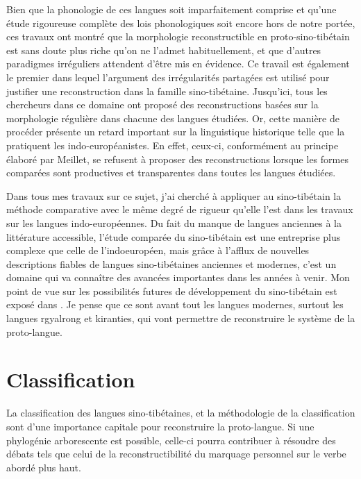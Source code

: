 \documentclass[oldfontcommands,oneside,a4paper,11pt]{memoir}
\begin{document}
Bien que la phonologie de ces langues soit imparfaitement comprise et qu’une étude rigoureuse complète des lois phonologiques soit encore hors de notre portée, ces travaux ont montré que la morphologie reconstructible en proto-sino-tibétain est sans doute plus riche qu’on ne l’admet habituellement, et que d’autres paradigmes irréguliers attendent d’être mis en évidence. Ce travail est également le premier dans lequel l’argument des irrégularités partagées est utilisé pour justifier une reconstruction dans la famille sino-tibétaine. Jusqu’ici, tous les chercheurs dans ce domaine ont proposé des reconstructions basées sur la morphologie régulière dans chacune des langues étudiées. Or, cette manière de procéder présente un retard important sur la linguistique historique telle que la pratiquent les indo-européanistes. En effet, ceux-ci, conformément au principe élaboré par Meillet, se refusent à proposer des reconstructions lorsque les formes comparées sont productives et transparentes dans toutes les langues étudiées. 


	Dans tous mes travaux sur ce sujet, j’ai cherché à appliquer au sino-tibétain la méthode comparative avec le même degré de rigueur qu’elle l’est dans les travaux sur les langues indo-européennes. Du fait du manque de langues anciennes à la littérature accessible, l’étude comparée du sino-tibétain est une entreprise plus complexe que celle de l’indoeuropéen, mais grâce à l’afflux de nouvelles descriptions fiables de langues sino-tibétaines anciennes et modernes, c’est un domaine qui va connaître des avancées importantes dans les années à venir. Mon point de vue sur les possibilités futures de développement du sino-tibétain est exposé dans \citet{jacques2012genetic}. Je pense que ce sont avant tout les langues modernes, surtout les langues rgyalrong et kiranties, qui vont permettre de reconstruire le système de la proto-langue. 

	\section{Classification}
	La classification des langues sino-tibétaines, et la méthodologie de la classification sont d'une importance capitale pour reconstruire la proto-langue. Si une phylogénie arborescente est possible, celle-ci pourra contribuer à résoudre des débats tels que celui de la reconstructibilité du marquage personnel sur le verbe abordé plus haut.
	
\end{document}
